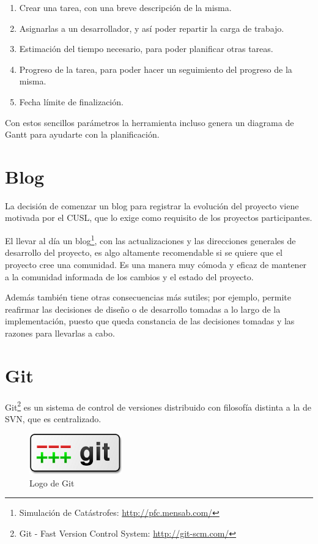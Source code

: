 \begin{enumerate}
 \item Crear una tarea, con una breve descripción de la misma.
 \item Asignarlas a un desarrollador, y así poder repartir la carga de trabajo.
 \item Estimación del tiempo necesario, para poder planificar otras tareas.
 \item Progreso de la tarea, para poder hacer un seguimiento del progreso de la
 misma.
 \item Fecha límite de finalización.
\end{enumerate}

Con estos sencillos parámetros la herramienta incluso genera un diagrama de
Gantt para ayudarte con la planificación.


\section{Blog}

La decisión de comenzar un blog para registrar la evolución del proyecto viene
motivada por el CUSL, que lo exige como requisito de los proyectos
participantes.

El llevar al día un blog\footnote{Simulación de Catástrofes:
\url{http://pfc.mensab.com/}}, con las actualizaciones y las direcciones
generales de desarrollo del proyecto, es algo altamente recomendable si se
quiere que el proyecto cree una comunidad. Es una manera muy cómoda y eficaz de
mantener a la comunidad informada de los cambios y el estado del proyecto.

Además también tiene otras consecuencias más sutiles; por ejemplo, permite
reafirmar las decisiones de diseño o de desarrollo tomadas a lo largo de la
implementación, puesto que queda constancia de las decisiones tomadas y las
razones para llevarlas a cabo.

\section{Git}

Git\footnote{Git - Fast Version Control System: \url{http://git-scm.com/}} es
un sistema de control de versiones distribuido con filosofía distinta a la de
SVN, que es centralizado.

\begin{figure}[H]
 \centering
 \includegraphics[width=40mm]{figuras/cap5/git.png}
 \caption{Logo de Git}
\end{figure}

